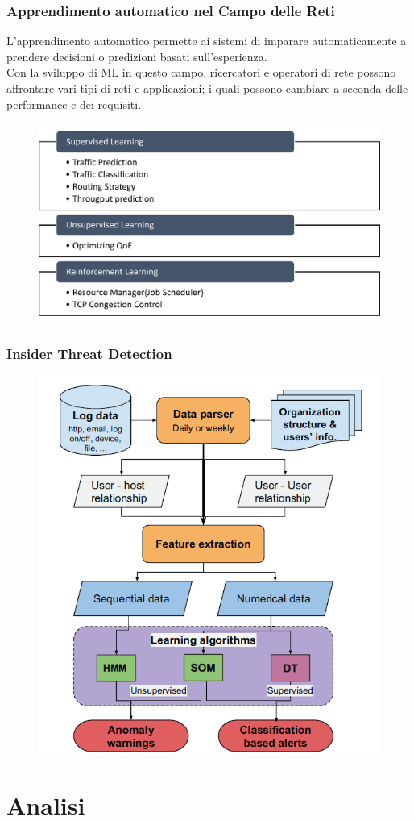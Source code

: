 \documentclass[xcolor=dvipsnames]{beamer}
\begin{document}
\begin{frame}
    \frametitle{Apprendimento automatico nel Campo delle Reti}
    L'\alert{apprendimento automatico} permette ai sistemi di imparare automaticamente a prendere decisioni o predizioni basati sull'esperienza.\\
    Con la sviluppo di ML in questo campo, ricercatori e operatori di rete possono affrontare vari tipi di reti e applicazioni; i quali possono cambiare a seconda delle performance e dei requisiti.
    \begin{figure}[htbp]
        \includegraphics[width=.75\textwidth,height=.62\textheight]{RicercaMLNetworking.png}
    \end{figure}
\end{frame}
\begin{frame}
    \frametitle{Insider Threat Detection}
    \begin{figure}
        \includegraphics[width=.60\textwidth,height=.80\textheight]{workflowIntrusionThreat.png}
    \end{figure}
\end{frame}
\section{Analisi}
\end{document}
